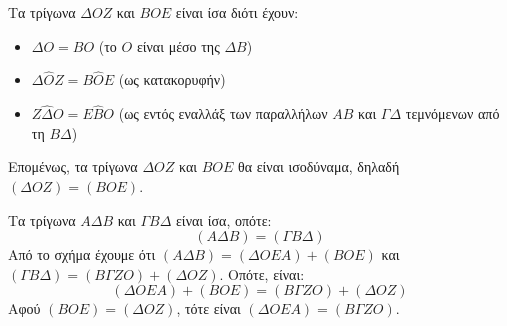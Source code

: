 \begin{alist}
    \item Τα τρίγωνα $\Delta OZ$ και $BOE$ είναι ίσα διότι έχουν:
    \begin{itemize}
        \item $\Delta O=BO$ (το $O$ είναι μέσο της $\Delta B$)
        \item $\Delta \hat{O}Z = B \hat{O}E$ (ως κατακορυφήν)
        \item $Z \hat{\Delta}O = E \hat{B}O$ (ως εντός εναλλάξ των παραλλήλων $AB$ και $\Gamma \Delta$ τεμνόμενων από τη $B\Delta$)
    \end{itemize}
    Επομένως, τα τρίγωνα $\Delta OZ$ και $BOE$ θα είναι ισοδύναμα, δηλαδή $(\Delta OZ) = (BOE)$.

    \item Τα τρίγωνα $A\Delta B$ και $\Gamma B \Delta$ είναι ίσα, οπότε:
    \[ (A\Delta B) = (\Gamma B \Delta) \]
    Από το σχήμα έχουμε ότι $(A\Delta B) = (\Delta OEA) + (BOE)$ και $(\Gamma B \Delta) = (B\Gamma ZO) + (\Delta OZ)$.
    Οπότε, είναι:
    \[ (\Delta OEA) + (BOE) = (B\Gamma ZO) + (\Delta OZ) \]
    Αφού $(BOE) = (\Delta OZ)$, τότε είναι $(\Delta OEA) = (B\Gamma ZO)$.
\end{alist}